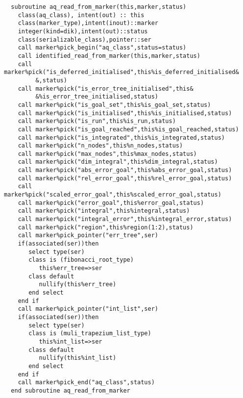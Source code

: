 \begin{Verbatim}
  subroutine aq_read_from_marker(this,marker,status)
    class(aq_class), intent(out) :: this
    class(marker_type),intent(inout)::marker
    integer(kind=dik),intent(out)::status  
    class(serializable_class),pointer::ser
    call marker%pick_begin("aq_class",status=status)
    call identified_read_from_marker(this,marker,status)
    call marker%pick("is_deferred_initialised",this%is_deferred_initialised&
         &,status)
    call marker%pick("is_error_tree_initialised",this&
         &%is_error_tree_initialised,status)
    call marker%pick("is_goal_set",this%is_goal_set,status)
    call marker%pick("is_initialised",this%is_initialised,status)
    call marker%pick("is_run",this%is_run,status)
    call marker%pick("is_goal_reached",this%is_goal_reached,status)
    call marker%pick("is_integrated",this%is_integrated,status)
    call marker%pick("n_nodes",this%n_nodes,status)
    call marker%pick("max_nodes",this%max_nodes,status)
    call marker%pick("dim_integral",this%dim_integral,status)    
    call marker%pick("abs_error_goal",this%abs_error_goal,status)
    call marker%pick("rel_error_goal",this%rel_error_goal,status)
    call marker%pick("scaled_error_goal",this%scaled_error_goal,status)
    call marker%pick("error_goal",this%error_goal,status)
    call marker%pick("integral",this%integral,status)
    call marker%pick("integral_error",this%integral_error,status)
    call marker%pick("region",this%region(1:2),status)
    call marker%pick_pointer("err_tree",ser)
    if(associated(ser))then
       select type(ser)
       class is (fibonacci_root_type)
          this%err_tree=>ser
       class default
          nullify(this%err_tree)
       end select
    end if
    call marker%pick_pointer("int_list",ser)
    if(associated(ser))then
       select type(ser)
       class is (muli_trapezium_list_type)
          this%int_list=>ser
       class default
          nullify(this%int_list)
       end select
    end if
    call marker%pick_end("aq_class",status)
  end subroutine aq_read_from_marker
\end{Verbatim}

